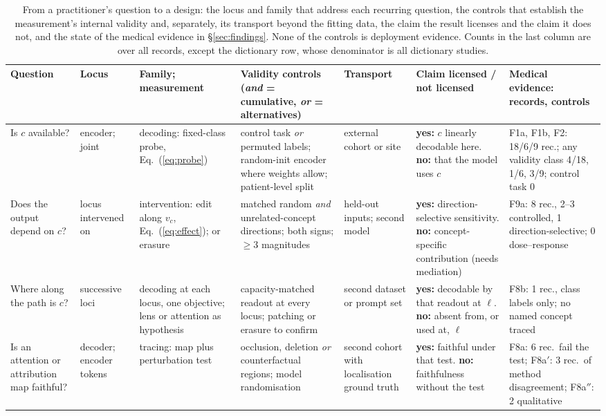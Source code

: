 \begin{table}[!t]
\centering\footnotesize\setlength\tabcolsep{2.5pt}\renewcommand{\arraystretch}{1.0}
\caption{From a practitioner's question to a design: the locus and family that address each recurring
question, the controls that establish the measurement's internal validity and, separately, its transport
beyond the fitting data, the claim the result licenses and the claim it does not, and the state of the
medical evidence in \S\ref{sec:findings}. None of the controls is deployment evidence. Counts in the last column are over all records, except the
dictionary row, whose denominator is all \Nsae{} dictionary studies.}
\label{tab:practice}
\begin{tabular}{@{}L{1.70cm}L{1.25cm}L{2.35cm}L{3.15cm}L{1.55cm}L{2.85cm}L{2.35cm}@{}}
\toprule
Question & Locus & Family; measurement & Validity controls (\emph{and} = cumulative, \emph{or} = alternatives) & Transport & Claim licensed / not licensed & Medical evidence: records, controls \\
\midrule
Is $c$ available? & encoder; joint & decoding: fixed-class probe, Eq.~(\ref{eq:probe}) & control task \emph{or} permuted labels; random-init encoder where weights allow; patient-level split & external cohort or site & \textbf{yes:} $c$ linearly decodable here. \textbf{no:} that the model uses $c$ & F1a, F1b, F2: 18/6/9 rec.; any validity class 4/18, 1/6, 3/9; control task 0 \\
Does the output depend on $c$? & locus intervened on & intervention: edit along $v_c$, Eq.~(\ref{eq:effect}); or erasure & matched random \emph{and} unrelated-concept directions; both signs; $\ge$3 magnitudes & held-out inputs; second model & \textbf{yes:} direction-selective sensitivity. \textbf{no:} concept-specific contribution (needs mediation) & F9a: 8 rec., 2--3 controlled, 1 direction-selective; 0 dose--response \\
Where along the path is $c$? & successive loci & decoding at each locus, one objective; lens or attention as hypothesis & capacity-matched readout at every locus; patching or erasure to confirm & second dataset or prompt set & \textbf{yes:} decodable by that readout at $\ell$. \textbf{no:} absent from, or used at, $\ell$ & F8b: 1 rec., class labels only; no named concept traced \\
Is an attention or attribution map faithful? & decoder; encoder tokens & tracing: map plus perturbation test & occlusion, deletion \emph{or} counterfactual regions; model randomisation & second cohort with localisation ground truth & \textbf{yes:} faithful under that test. \textbf{no:} faithfulness without the test & F8a: 6 rec.\ fail the test; F8a$'$: 3 rec.\ of method disagreement; F8a$''$: 2 qualitative \\

\end{tabular}
\end{table}
